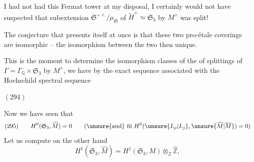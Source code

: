 I had not had this Fermat tower at my disposal, I certainly would not have suspected that  subextension $\mathfrak S^{+\wedge}/\mu_{\mathfrak S}$  of $\widetilde H^+\simeq\mathfrak S_3$ by $M^{\wedge}$ was split!

The conjecture that presents itself at once is that these two pro-étale coverings are isomorphic -- the isomorphism between the two  then unique.


 This is the moment to determine the isomorphism classes of the  of splittings of  $\Gamma=\Gamma_{\mathbb Q}\times\mathfrak S_3$ by $M^{\wedge}$, we have by the exact sequence associated with the Hochschild spectral sequence

$(294)$\quad
{}

Now we have seen that
\[
(295)\qquad H^0(\mathfrak S_3,\widehat M)=0
\qquad(\text{\unsure{and} }\overline{\mathrm m}\ H^0(\unsure{L_\rho|L_j},\unsure{\widehat M|\overline M})=0)
\]
 Let us compute on the other hand
\[
H^1(\mathfrak S_3,\widehat M)=H^1(\mathfrak S_3,M)\otimes_{\mathbb Z}\widehat{\mathbb Z},
\]





